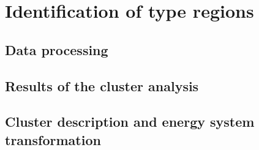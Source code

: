 \chapter{Identification of type regions}




\section{Data processing}









\section{Results of the cluster analysis}





\section{Cluster description and energy system transformation}